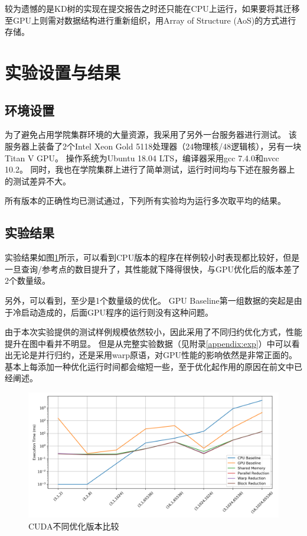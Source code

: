 \documentclass[logo,reportComp]{thesis}
\def\sharedmem{\textcolor{red}{\kaiti 共享内存}}
\begin{document}
较为遗憾的是KD树的实现在提交报告之时还只能在CPU上运行，如果要将其迁移至GPU上则需对数据结构进行重新组织，用Array of Structure (AoS)的方式进行存储。

\section{实验设置与结果}
\label{sec:exp}
\subsection{环境设置}
为了避免占用学院集群环境的大量资源，我采用了另外一台服务器进行测试。
该服务器上装备了2个Intel Xeon Gold 5118处理器（24物理核/48逻辑核），另有一块Titan V GPU。
操作系统为Ubuntu 18.04 LTS，编译器采用gcc 7.4.0和nvcc 10.2。
同时，我也在学院集群上进行了简单测试，运行时间均与下述在服务器上的测试差异不大。

所有版本的正确性均已测试通过，下列所有实验均为运行多次取平均的结果。

\subsection{实验结果}
\label{sub:exp}
实验结果如图\ref{fig:cuda}所示，可以看到CPU版本的程序在样例较小时表现都比较好，但是一旦查询/参考点的数目提升了，其性能就下降得很快，与GPU优化后的版本差了2个数量级。

另外，可以看到，至少是1个数量级的优化。
GPU Baseline第一组数据的突起是由于冷启动造成的，后面GPU程序的运行则没有这种问题。

由于本次实验提供的测试样例规模依然较小，因此采用了不同归约优化方式，性能提升在图中看并不明显。
但是从完整实验数据（见附录\ref{appendix:exp}）中可以看出无论是并行归约，还是采用warp原语，对GPU性能的影响依然是非常正面的。
基本上每添加一种优化运行时间都会缩短一些，至于优化起作用的原因在前文中已经阐述。

\begin{figure}[H]
\centering
\includegraphics[width=\linewidth]{fig/cuda.png}
\caption{CUDA不同优化版本比较}
\label{fig:cuda}
\end{figure}
\end{document}
